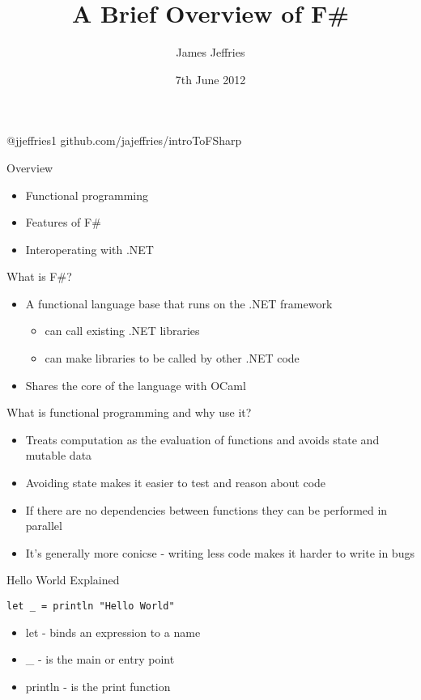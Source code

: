 \documentclass[landscape]{slides}
\author{James Jeffries}
\title{A Brief Overview of F\#}
\date{7th June 2012}
\begin{document}
\begin{slide}
\maketitle
@jjeffries1
github.com/jajeffries/introToFSharp
\end{slide}

\begin{slide}{Overview}
\begin{itemize}
\item Functional programming 
\item Features of F\#
\item Interoperating with .NET
\end{itemize}
\end{slide}

\begin{slide}{What is F\#?}
\begin{itemize}
\item A functional language base that runs on the .NET framework
\begin{itemize}
\item can call existing .NET libraries
\item can make libraries to be called by other .NET code
\end{itemize}
\item Shares the core of the language with OCaml
\end{itemize}
\end{slide}

\begin{slide}{What is functional programming and why use it?}
\begin{itemize}
\item Treats computation as the evaluation of functions and avoids state and mutable data
\item Avoiding state makes it easier to test and reason about code
\item If there are no dependencies between functions they can be performed in parallel
\item It's generally more conicse - writing less code makes it harder to write in bugs
\end{itemize}
\end{slide}

\begin{slide}{Hello World Explained}
\begin{verbatim}
let _ = println "Hello World"
\end{verbatim}
\begin{itemize}
\item let - binds an expression to a name
\item \_ - is the main or entry point
\item println - is the print function
\end{itemize}
\end{slide}
\end{document}
